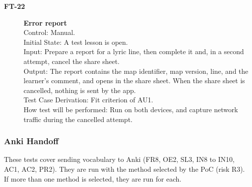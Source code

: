 \documentclass[12pt, titlepage]{article}
\newcommand{\tid}[1]{\hypertarget{test:#1}{\textbf{#1}}}
\begin{document}
\begin{description}
\item[\tid{FT-22}] \textbf{Error report}\\
Control: Manual.\\
Initial State: A test lesson is open.\\
Input: Prepare a report for a lyric line, then complete it and, in a second
attempt, cancel the share sheet.\\
Output: The report contains the map identifier, map version, line, and the
learner's comment, and opens in the share sheet. When the share sheet is
cancelled, nothing is sent by the app.\\
Test Case Derivation: Fit criterion of AU1.\\
How test will be performed: Run on both devices, and capture network traffic
during the cancelled attempt.

\end{description}

\subsubsection{Anki Handoff} \label{SecAnkiTests}

These tests cover sending vocabulary to Anki (FR8, OE2, SL3, IN8 to IN10, AC1,
AC2, PR2). They are run with the method selected by the PoC (risk R3). If
more than one method is selected, they are run for each.
\end{document}

